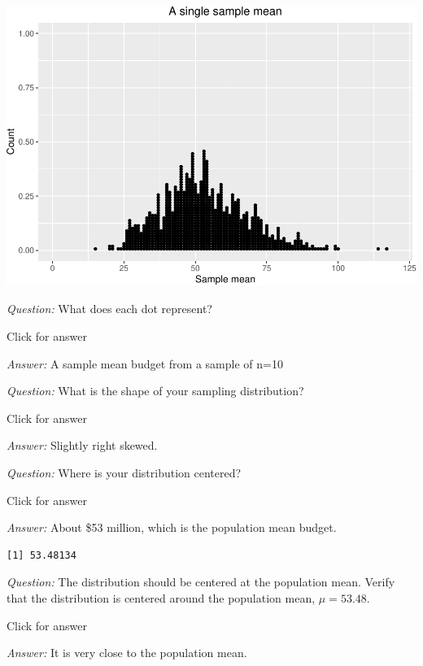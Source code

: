 \documentclass[
]{book}
\newenvironment{Shaded}{\begin{snugshade}}{\end{snugshade}}
\newcommand{\AttributeTok}[1]{\textcolor[rgb]{0.77,0.63,0.00}{#1}}
\newcommand{\ConstantTok}[1]{\textcolor[rgb]{0.00,0.00,0.00}{#1}}
\newcommand{\FunctionTok}[1]{\textcolor[rgb]{0.00,0.00,0.00}{#1}}
\newcommand{\NormalTok}[1]{#1}
\newcommand{\SpecialCharTok}[1]{\textcolor[rgb]{0.00,0.00,0.00}{#1}}
\begin{document}
\includegraphics[width=1\linewidth]{Class_Activity_7_files/figure-latex/unnamed-chunk-18-1}

\emph{Question:} What does each dot represent?

Click for answer

\emph{Answer:} A sample mean budget from a sample of n=10

\emph{Question:} What is the shape of your sampling distribution?

Click for answer

\emph{Answer:} Slightly right skewed.

\emph{Question:} Where is your distribution centered?

Click for answer

\emph{Answer:} About \$53 million, which is the population mean budget.

\begin{Shaded}
\end{Shaded}

\begin{verbatim}
[1] 53.48134
\end{verbatim}

\emph{Question:} The distribution should be centered at the population mean. Verify that the distribution is centered around the population mean, \(\mu = 53.48\).

Click for answer

\emph{Answer:} It is very close to the population mean.
\end{document}
